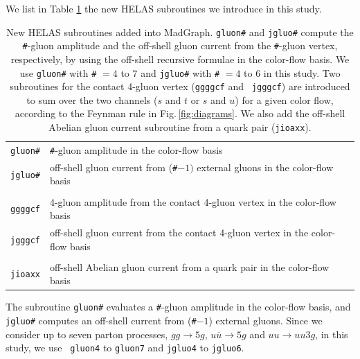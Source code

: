 \documentclass[a4paper,11pt]{article}
\begin{document}
 We list in Table \ref{tb:subroutines} the new HELAS subroutines we
 introduce in this study.
\begin{table}
\begin{center}
\small
\begin{tabular}{r|l}
\hline\hline
{\tt gluon\#}&{\tt \#}-gluon amplitude in the color-flow basis\\
{\tt jgluo\#}&off-shell gluon current from ({\tt \#}$-1)$ external gluons in the
     color-flow basis\\\\
{\tt ggggcf}&4-gluon amplitude from the contact 4-gluon vertex in
 the color-flow basis\\
{\tt jgggcf}&off-shell gluon current from the contact 4-gluon vertex in
 the color-flow basis\\\\
 {\tt jioaxx}&off-shell Abelian gluon current from a quark pair in
 the color-flow basis\\
\hline\hline
\end{tabular}
\caption{New HELAS subroutines added into
 MadGraph. {\tt gluon\#} and {\tt jgluo\#} compute the {\tt \#}-gluon
 amplitude and the off-shell gluon
 current from the \mbox{{\tt \#}-gluon} vertex, respectively, by using the off-shell
 recursive formulae in the color-flow basis. We use {\tt gluon\#} with
 {\tt \#} $=4$
 to $7$ and {\tt jgluo\#} with {\tt \#} $=4$ to $6$ in this study. Two subroutines for the contact 4-gluon vertex ({\tt ggggcf} and {\tt
 jgggcf}) are introduced to sum over the two channels ($s$ and $t$ or
 $s$ and $u$) for a given color flow, according to the Feynman rule in
 Fig.\,\ref{fig:diagrams}.  We also add the off-shell Abelian
 gluon current subroutine from a quark pair ({\tt jioaxx}).}
\label{tb:subroutines}
\end{center}
\end{table}
The subroutine {\tt gluon\#} evaluates a {\tt \#}-gluon
  amplitude in the color-flow basis, and {\tt jgluo\#} computes an off-shell current from
  ({\tt \#}$-1$) external gluons. Since we consider up to seven parton processes, $gg\rightarrow 5g$, $u\overline{u}\rightarrow
  5g$ and $uu\rightarrow uu3g$, in this study, we use {\tt
  gluon4} to {\tt gluon7} and {\tt jgluo4} to {\tt jgluo6}.
\end{document}
